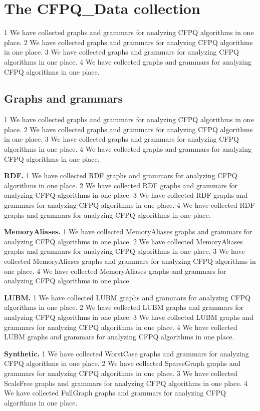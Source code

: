 \section{The CFPQ\_Data collection}
1 We have collected graphs and grammars for analyzing CFPQ algorithms in one place.
2 We have collected graphs and grammars for analyzing CFPQ algorithms in one place.
3 We have collected graphs and grammars for analyzing CFPQ algorithms in one place.
4 We have collected graphs and grammars for analyzing CFPQ algorithms in one place.

\subsection{Graphs and grammars}
1 We have collected graphs and grammars for analyzing CFPQ algorithms in one place.
2 We have collected graphs and grammars for analyzing CFPQ algorithms in one place.
3 We have collected graphs and grammars for analyzing CFPQ algorithms in one place.
4 We have collected graphs and grammars for analyzing CFPQ algorithms in one place.

\textbf{RDF.}
1 We have collected RDF graphs and grammars for analyzing CFPQ algorithms in one place.
2 We have collected RDF graphs and grammars for analyzing CFPQ algorithms in one place.
3 We have collected RDF graphs and grammars for analyzing CFPQ algorithms in one place.
4 We have collected RDF graphs and grammars for analyzing CFPQ algorithms in one place.

\textbf{MemoryAliases.}
1 We have collected MemoryAliases graphs and grammars for analyzing CFPQ algorithms in one place.
2 We have collected MemoryAliases graphs and grammars for analyzing CFPQ algorithms in one place.
3 We have collected MemoryAliases graphs and grammars for analyzing CFPQ algorithms in one place.
4 We have collected MemoryAliases graphs and grammars for analyzing CFPQ algorithms in one place.

\textbf{LUBM.}
1 We have collected LUBM graphs and grammars for analyzing CFPQ algorithms in one place.
2 We have collected LUBM graphs and grammars for analyzing CFPQ algorithms in one place.
3 We have collected LUBM graphs and grammars for analyzing CFPQ algorithms in one place.
4 We have collected LUBM graphs and grammars for analyzing CFPQ algorithms in one place.

\textbf{Synthetic.}
1 We have collected WorstCase graphs and grammars for analyzing CFPQ algorithms in one place.
2 We have collected SparseGraph graphs and grammars for analyzing CFPQ algorithms in one place.
3 We have collected ScaleFree graphs and grammars for analyzing CFPQ algorithms in one place.
4 We have collected FullGraph graphs and grammars for analyzing CFPQ algorithms in one place.

